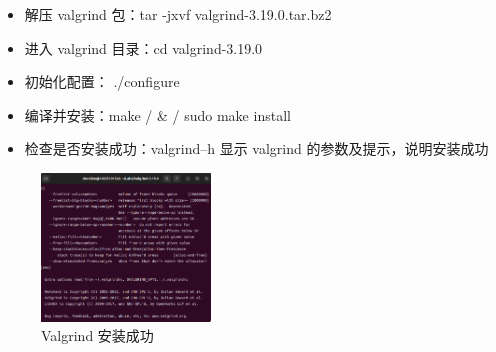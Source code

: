 \begin{itemize}
    \item 解压 valgrind 包：tar -jxvf valgrind-3.19.0.tar.bz2
    \item 进入 valgrind 目录：cd valgrind-3.19.0
    \item 初始化配置： ./configure
    \item 编译并安装：make / \& / sudo make install
    \item 检查是否安装成功：valgrind–h 显示 valgrind 的参数及提示，说明安装成功
\end{itemize}

\begin{figure} [H]
    \centering
    \includegraphics[width=0.4\textwidth]{valgrind.png}
    \caption{Valgrind 安装成功}
\end{figure}